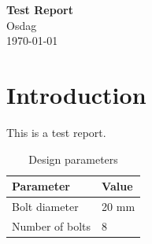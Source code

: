 \documentclass[10pt]{article}
\begin{document}
\begin{center}
{\Large\textbf{Test Report}} \\[4pt]
{\normalsize {Osdag}} \\[2pt]
{\small {\today}}
\end{center}




\tableofcontents
\newpage



\listoffigures
\newpage



\listoftables
\newpage


\section{Introduction}

This is a test report.

\begin{table}[h]
\centering
\caption{Design parameters}
\label{tab:params}
\begin{tabular}{ll}
Parameter & Value \\ \hline
Bolt diameter & 20 mm \\
\hline
Number of bolts & 8 \\
\hline
\end{tabular}
\end{table}
\end{document}
